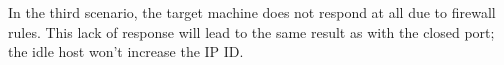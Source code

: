 \documentclass[11pt,a4paper]{article}
\begin{document}
In the third scenario, the target machine does not respond at all due to firewall rules. This lack of response will lead to the same result as with the closed port; the idle host won’t increase the IP ID.
%
%
%
%
\end{document}
